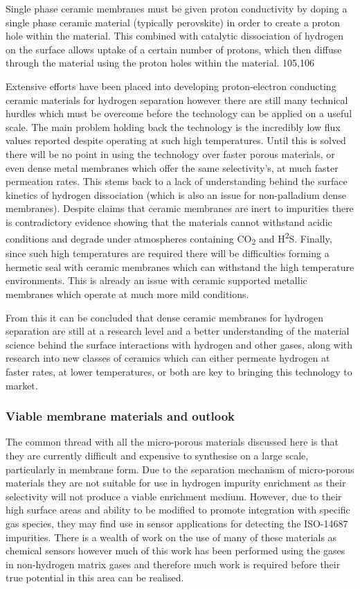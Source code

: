 Single phase ceramic membranes must be given proton conductivity by doping a single phase 
ceramic material (typically perovskite) in order to create a proton hole within the material. 
This combined with catalytic dissociation of hydrogen  on the surface allows uptake of a 
certain number of protons, which then diffuse through the material using the proton holes 
within the material. 105,106

Extensive efforts have been placed into developing proton-electron conducting ceramic 
materials for hydrogen separation however there are still many technical hurdles which must 
be overcome before the technology can be applied on a useful scale. The main problem holding 
back the technology is the incredibly low flux values reported despite operating at such high 
temperatures. Until this is solved there will be no point in using the technology over 
faster porous materials, or even dense metal membranes which offer the same selectivity’s, 
at much faster permeation rates. This stems back to a lack of understanding behind the 
surface kinetics of hydrogen dissociation (which is also an issue for non-palladium dense 
membranes). Despite claims that ceramic membranes are inert to impurities there is 
contradictory evidence showing that the materials cannot withstand acidic conditions and 
degrade under atmospheres containing CO\textsubscript{2} and H\textsuperscript{2}S. 
Finally, since such high temperatures are 
required there will be difficulties forming a hermetic seal with ceramic membranes which can 
withstand the high temperature environments. This is already an issue with ceramic supported 
metallic membranes which operate at much more mild conditions. 

From this it can be concluded that dense ceramic membranes for hydrogen separation are still 
at a research level and a better understanding of the material science behind the surface 
interactions with hydrogen and other gases, along with research into new classes of ceramics 
which can either permeate hydrogen at faster rates, at lower temperatures, or both are key 
to bringing this technology to market. 

\subsubsection{Viable membrane materials and outlook}
The common thread with all the micro-porous materials discussed here is that they are 
currently difficult and expensive to synthesise on a large scale, particularly in membrane 
form. Due to the separation mechanism of micro-porous materials they are not suitable for use 
in hydrogen impurity enrichment as their selectivity will not produce a viable enrichment 
medium. However, due to their high surface areas and ability to be modified to promote 
integration with specific gas species, they may find use in sensor applications for detecting 
the ISO-14687 impurities. There is a wealth of work on the use of many of these materials as 
chemical sensors however much of this work has been performed using the gases in non-hydrogen 
matrix gases and therefore much work is required before their true potential in this area can 
be realised. 

